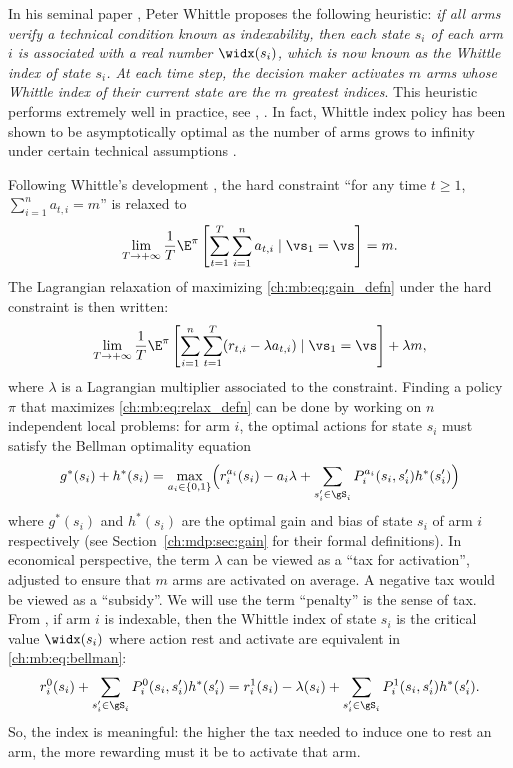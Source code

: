 In his seminal paper \cite{whittle1988restless}, Peter Whittle proposes the following heuristic: \textit{if all arms verify a technical condition known as indexability, then each state $s_i$ of each arm $i$ is associated with a real number $\widx(s_i)$, which is now known as the Whittle index of state $s_i$.
At each time step, the decision maker activates $m$ arms whose Whittle index of their current state are the $m$ greatest indices}.
This heuristic performs extremely well in practice, see \eg, \cite{glazebrook2002index, ansell2003whittle, glazebrook2006some}.
In fact, Whittle index policy has been shown to be asymptotically optimal as the number of arms grows to infinity under certain technical assumptions \cite{weber1990index, lott2000optimality, verloop2016asymptotically}.

Following Whittle's development \cite{whittle1988restless}, the hard constraint ``for any time $t\ge1$, $\sum_{i=1}^{n}a_{t,i}=m$'' is relaxed to
\begin{align*}
    \lim_{T\to+\infty}\frac1T \E^\pi\left[\sum_{t=1}^{T} \sum_{i=1}^n a_{t,i} \mid \vs_1=\vs\right]=m.
\end{align*}
The Lagrangian relaxation of maximizing \eqref{ch:mb:eq:gain_defn} under the hard constraint is then written:
\begin{align}
    \lim_{T\to+\infty}\frac1T \E^\pi\left[\sum_{i=1}^n \sum_{t=1}^{T} (r_{t,i} -\lambda a_{t,i}) \mid \vs_1=\vs\right] +\lambda m, \label{ch:mb:eq:relax_defn}
\end{align}
where $\lambda$ is a Lagrangian multiplier associated to the constraint.
Finding a policy $\pi$ that maximizes \eqref{ch:mb:eq:relax_defn} can be done by working on $n$ independent local problems:
for arm $i$, the optimal actions for state $s_i$ must satisfy the Bellman optimality equation
\begin{align}
    g^*(s_i) +h^*(s_i) =\max_{a_i\in\{0,1\}} \Bigl(r^{a_i}_i(s_i)-a_i\lambda +\sum_{s'_i\in\gS_i}P^{a_i}_i(s_i, s'_i)h^*(s'_i)\Bigr) \label{ch:mb:eq:bellman}
\end{align}
where $g^*(s_i)$ and $h^*(s_i)$ are the optimal gain and bias of state $s_i$ of arm $i$ respectively (see Section~\ref{ch:mdp:sec:gain} for their formal definitions).
In economical perspective, the term $\lambda$ can be viewed as a ``tax for activation'', adjusted to ensure that $m$ arms are activated on average.
A negative tax would be viewed as a ``subsidy''.
We will use the term ``penalty'' is the sense of tax.
From \cite{whittle1988restless,whittle1996optimal}, if arm $i$ is indexable, then the Whittle index of state $s_i$ is the critical value $\widx(s_i)$ where action rest and activate are equivalent in \eqref{ch:mb:eq:bellman}:
\begin{align}
    r^0_i(s_i) +\sum_{s'_i\in\gS_i}P^0_i(s_i, s'_i)h^*(s'_i)
    =r^1_i(s_i)-\lambda(s_i) +\sum_{s'_i\in\gS_i}P^1_i(s_i, s'_i)h^*(s'_i). \label{ch:mb:eq:widx_defn}
\end{align}
So, the index is meaningful: the higher the tax needed to induce one to rest an arm, the more rewarding must it be to activate that arm.

